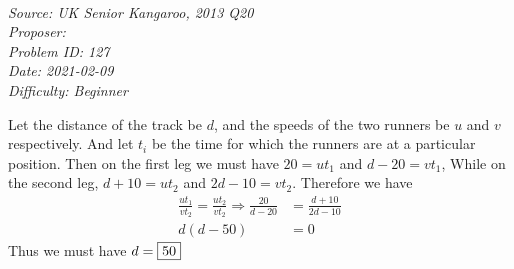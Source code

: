 \SSbreak\\
\emph{Source: UK Senior Kangaroo, 2013 Q20}\\
\emph{Proposer: \Pss}\\
\emph{Problem ID: 127}\\
\emph{Date: 2021-02-09}\\
\emph{Difficulty: Beginner}\\
\SSbreak

\bigskip

\begin{solution}\hfil\medskip

Let the distance of the track be \(d\), and the speeds of the two runners be \(u\) and \(v\) respectively. And let \(t_i\) be the time for which the runners are at a particular position. Then on the first leg we must have \(20 = ut_1\) and \(d - 20 = vt_1\), While on the second leg, \(d + 10 = ut_2\) and \(2d - 10 = vt_2\). Therefore we have 
\begin{align}
    \frac{ut_1}{vt_2} = \frac{ut_2}{vt_2}\Rightarrow \frac{20}{d - 20} &= \frac{d + 10}{2d - 10}\\
    d(d - 50) &= 0
\end{align}
Thus we must have \(d = \fbox{50}\)
\end{solution}\bigskip
